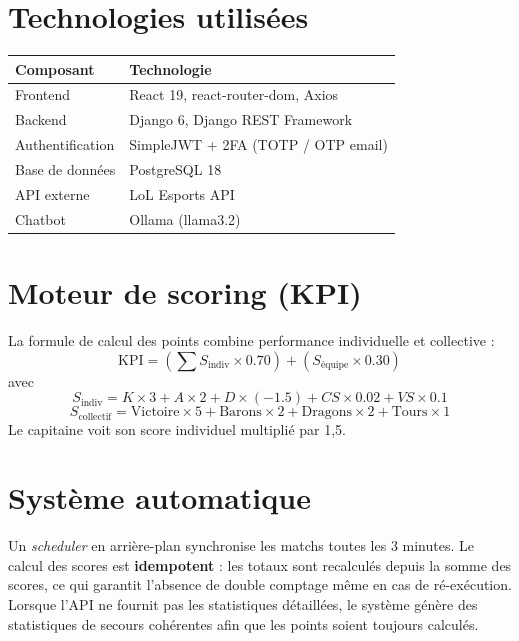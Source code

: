\documentclass[12pt,a4paper]{report}
\begin{document}
\section{Technologies utilisées}
\begin{center}
\begin{tabular}{ll}
\toprule
\textbf{Composant} & \textbf{Technologie} \\
\midrule
Frontend & React 19, react-router-dom, Axios \\
Backend & Django 6, Django REST Framework \\
Authentification & SimpleJWT + 2FA (TOTP / OTP email) \\
Base de données & PostgreSQL 18 \\
API externe & LoL Esports API \\
Chatbot & Ollama (llama3.2) \\
\bottomrule
\end{tabular}
\end{center}

\section{Moteur de scoring (KPI)}
La formule de calcul des points combine performance individuelle et collective :
\[
\text{KPI} = \left( \sum S_{\text{indiv}} \times 0.70 \right) + \left( S_{\text{équipe}} \times 0.30 \right)
\]
avec
\[
S_{\text{indiv}} = K\times 3 + A\times 2 + D\times(-1.5) + CS\times 0.02 + VS\times 0.1
\]
\[
S_{\text{collectif}} = \text{Victoire}\times 5 + \text{Barons}\times 2 + \text{Dragons}\times 2 + \text{Tours}\times 1
\]
Le capitaine voit son score individuel multiplié par 1,5.

\section{Système automatique}
Un \textit{scheduler} en arrière-plan synchronise les matchs toutes les 3 minutes.
Le calcul des scores est \textbf{idempotent} : les totaux sont recalculés depuis
la somme des scores, ce qui garantit l'absence de double comptage même en cas de
ré-exécution. Lorsque l'API ne fournit pas les statistiques détaillées, le système
génère des statistiques de secours cohérentes afin que les points soient
toujours calculés.

\end{document}
